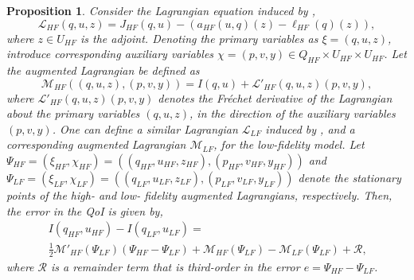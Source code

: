 \documentclass[review,sort&compress]{elsarticle}
\newtheorem{proposition}{Proposition}
\begin{document}
\begin{proposition}
Consider the Lagrangian equation induced by ,
%
\begin{equation}
\label{eq:InvsOpt_lag}
\mathcal{L}_{HF}(q,u,z)= J_{HF}(q,u)-(a_{HF}(u,q)(z)-\ell_{HF}(q)(z)),
\end{equation}
%
where $z\in U_{HF}$ is the adjoint. Denoting the primary variables as $\xi=(q,u,z)$, introduce corresponding auxiliary variables $\chi=(p,v,y)\in Q_{HF}\times U_{HF}\times U_{HF}$. Let the augmented Lagrangian be defined as
%
\begin{equation}
\label{eq:InvsOpt_auglag}
\mathcal{M}_{HF}((q,u,z),(p,v,y)) = I(q,u) + \mathcal{L}'_{HF}(q,u,z)(p,v,y),
\end{equation}
%
where $\mathcal{L}'_{HF}(q,u,z)(p,v,y)$ denotes the Fr\'{e}chet derivative of the Lagrangian about the primary variables $(q,u,z)$, in the direction of the auxiliary variables $(p,v,y)$. One can define a similar Lagrangian $\mathcal{L}_{LF}$ induced by , and a corresponding augmented Lagrangian $\mathcal{M}_{LF}$, for the low-fidelity model. Let $\Psi_{HF}= (\xi_{HF},\chi_{HF})=((q_{HF},u_{HF},z_{HF}),(p_{HF},v_{HF},y_{HF}))$ and $\Psi_{LF}= (\xi_{LF},\chi_{LF})=((q_{LF},u_{LF},z_{LF}),(p_{LF},v_{LF},y_{LF}))$ denote the stationary points of the high- and low- fidelity augmented Lagrangians, respectively. Then, the error in the QoI is given by,
%
\begin{multline}
\label{eq:semifinErrExp}
I(q_{HF},u_{HF})-I(q_{LF},u_{LF})=\\\frac{1}{2}\mathcal{M}'_{HF}(\Psi_{LF})(\Psi_{HF}-\Psi_{LF})+\mathcal{M}_{HF}(\Psi_{LF})-\mathcal{M}_{LF}(\Psi_{LF})+\mathcal{R}\textrm{,}
\end{multline}
%
where $\mathcal{R}$ is a remainder term that is third-order in the error $e=\Psi_{HF}-\Psi_{LF}$.
\end{proposition}
%
\end{document}
